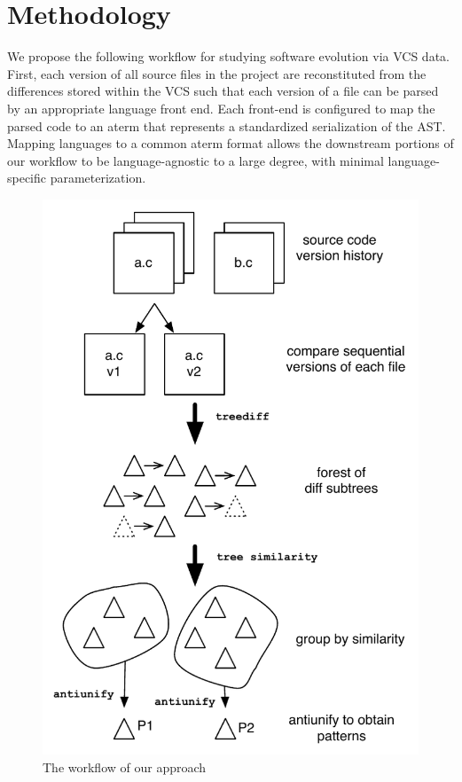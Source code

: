 \section{Methodology}
\label{sec:method}

We propose the following workflow for studying software evolution via VCS data.
First, each version of all source files in the project are reconstituted from
the differences stored within the VCS such that each version of a file can be
parsed by an appropriate language front end.  Each front-end is configured to
map the parsed code to an aterm that represents a standardized serialization of
the AST\@.  Mapping languages to a common aterm format allows the downstream
portions of our workflow to be language-agnostic to a large degree, with
minimal language-specific parameterization.

\begin{figure}
\begin{center}
\includegraphics[height=0.44\textheight]{figures/workflow.pdf}
\caption{The workflow of our approach}
\label{fig:workflow}
\end{center}
\end{figure}

